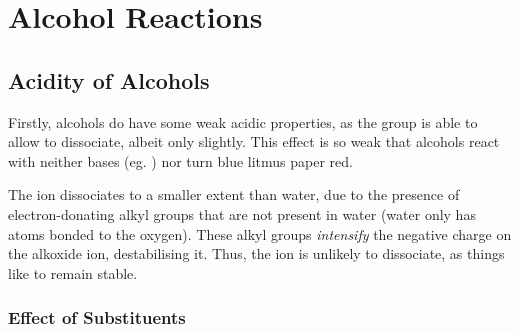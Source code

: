 


	\pagebreak
	\section{Alcohol Reactions}

		\subsection{Acidity of Alcohols}

			Firstly, alcohols do have some weak acidic properties, as the  group is able to allow  to dissociate, albeit
			only slightly. This effect is so weak that alcohols react with neither bases (eg. ) nor turn blue litmus paper red.

			The  ion dissociates to a smaller extent than water, due to the presence of electron-donating alkyl groups that are
			not present in water (water only has  atoms bonded to the oxygen). These alkyl groups \textit{intensify} the negative
			charge on the alkoxide ion, destabilising it. Thus, the  ion is unlikely to dissociate, as things like to remain stable.

			\subsubsection{Effect of Substituents}

